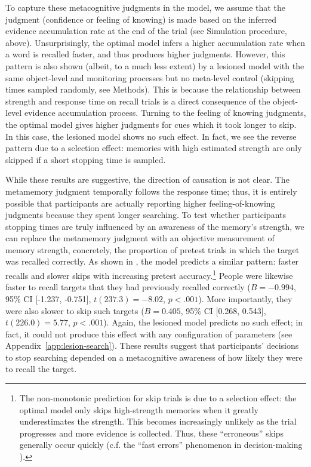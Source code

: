 To capture these metacognitive judgments in the model, we assume that the judgment (confidence or feeling of knowing) is made based on the inferred evidence accumulation rate at the end of the trial (see Simulation procedure, above). Unsurprisingly, the optimal model infers a higher accumulation rate when a word is recalled faster, and thus produces higher judgments. However, this pattern is also shown (albeit, to a much less extent) by a lesioned model with the same object-level and monitoring processes but no meta-level control (skipping times sampled randomly, see Methods). This is because the relationship between strength and response time on recall trials is a direct consequence of the object-level evidence accumulation process. Turning to the feeling of knowing judgments, the optimal model gives higher judgments for cues which it took longer to skip. In this case, the lesioned model shows no such effect. In fact, we see the reverse pattern due to a selection effect: memories with high estimated strength are only skipped if a short stopping time is sampled.

While these results are suggestive, the direction of causation is not clear. The metamemory judgment temporally follows the response time; thus, it is entirely possible that participants are actually reporting higher feeling-of-knowing judgments because they spent longer searching. To test whether participants stopping times are truly influenced by an awareness of the memory's strength, we can replace the metamemory judgment with an objective measurement of memory strength, concretely, the proportion of pretest trials in which the target was recalled correctly. As shown in , the model predicts a similar pattern: faster recalls and slower skips with increasing pretest accuracy.\footnote{%
    The non-monotonic prediction for skip trials is due to a selection effect: the optimal model only skips high-strength memories when it greatly underestimates the strength. This becomes increasingly unlikely as the trial progresses and more evidence is collected. Thus, these ``erroneous'' skips generally occur quickly (c.f. the ``fast errors'' phenomenon in decision-making  \citealp{ratcliff1998modeling}).
    }
People were likewise faster to recall targets that they had previously recalled correctly ($B = -0.994$, 95\% CI [-1.237, -0.751], $t(237.3)=-8.02$, $p < .001$). More importantly, they were also slower to skip such targets ($B = 0.405$, 95\% CI [0.268, 0.543], $t(226.0)=5.77$, $p < .001$). Again, the lesioned model predicts no such effect; in fact, it could not produce this effect with any configuration of parameters (see Appendix~\ref{app:lesion-search}). These results suggest that participants' decisions to stop searching depended on a metacognitive awareness of how likely they were to recall the target.

